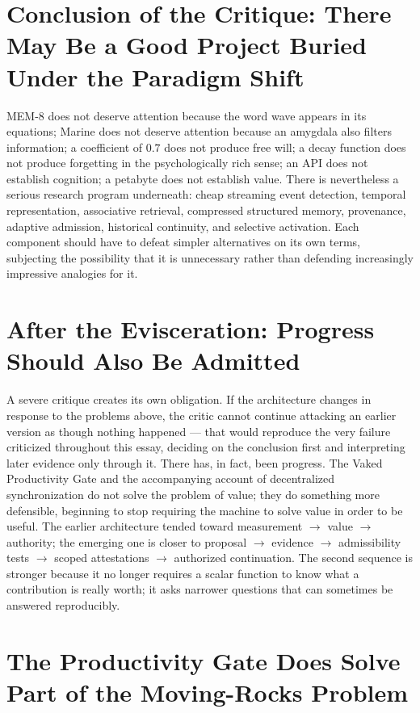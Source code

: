 \documentclass[12pt]{article}
\begin{document}
\section{Conclusion of the Critique: There May Be a Good Project Buried Under the Paradigm Shift}

MEM-8 does not deserve attention because the word wave appears in its equations; Marine does not deserve attention because an amygdala also filters information; a coefficient of $0.7$ does not produce free will; a decay function does not produce forgetting in the psychologically rich sense; an API does not establish cognition; a petabyte does not establish value. There is nevertheless a serious research program underneath: cheap streaming event detection, temporal representation, associative retrieval, compressed structured memory, provenance, adaptive admission, historical continuity, and selective activation. Each component should have to defeat simpler alternatives on its own terms, subjecting the possibility that it is unnecessary rather than defending increasingly impressive analogies for it.

\section{After the Evisceration: Progress Should Also Be Admitted}

A severe critique creates its own obligation. If the architecture changes in response to the problems above, the critic cannot continue attacking an earlier version as though nothing happened — that would reproduce the very failure criticized throughout this essay, deciding on the conclusion first and interpreting later evidence only through it. There has, in fact, been progress. The Vaked Productivity Gate and the accompanying account of decentralized synchronization do not solve the problem of value; they do something more defensible, beginning to stop requiring the machine to solve value in order to be useful. The earlier architecture tended toward measurement $\to$ value $\to$ authority; the emerging one is closer to proposal $\to$ evidence $\to$ admissibility tests $\to$ scoped attestations $\to$ authorized continuation. The second sequence is stronger because it no longer requires a scalar function to know what a contribution is really worth; it asks narrower questions that can sometimes be answered reproducibly.

\section{The Productivity Gate Does Solve Part of the Moving-Rocks Problem}
\end{document}
